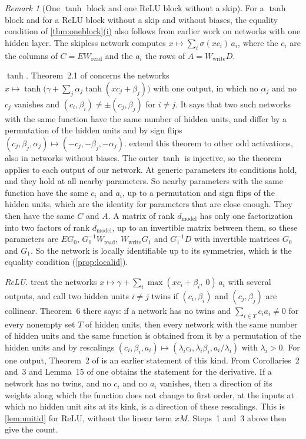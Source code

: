 \documentclass[10pt]{article}
\theoremstyle{definition}
\theoremstyle{remark}
\newtheorem{remark}[theorem]{Remark}
\newcommand{\Wread}{W_{\mathrm{read}}}
\newcommand{\Wwrite}{W_{\mathrm{write}}}
\newcommand{\dm}{d_{\mathrm{model}}}
\DeclareRobustCommand{\cpref}[2]{\hyperref[#1:#2]{\cref*{#1}(#2)}}
\begin{document}
\begin{remark}[One $\tanh$ block and one ReLU block without a skip]\label{rem:onemlp}
For a $\tanh$ block and for a ReLU block without a skip and without biases, the equality condition of \cpref{thm:oneblock}{i} also follows from earlier work on networks with one hidden layer. The skipless network computes $x \mapsto \sum_i \sigma(xc_i)\,a_i$, where the $c_i$ are the columns of $C = E\Wread$ and the $a_i$ the rows of $A = \Wwrite D$.

\emph{$\tanh$.} Theorem~2.1 of \citet{sussmann1992} concerns the networks $x \mapsto \tanh\big(\gamma + \sum_j \alpha_j\tanh(xc_j + \beta_j)\big)$ with one output, in which no $\alpha_j$ and no $c_j$ vanishes and $(c_i, \beta_i) \neq \pm(c_j, \beta_j)$ for $i \neq j$. It says that two such networks with the same function have the same number of hidden units, and differ by a permutation of the hidden units and by sign flips $(c_j, \beta_j, \alpha_j) \mapsto (-c_j, -\beta_j, -\alpha_j)$. \citet{albertini1993uniqueness} extend this theorem to other odd activations, also in networks without biases. The outer $\tanh$ is injective, so the theorem applies to each output of our network. At generic parameters its conditions hold, and they hold at all nearby parameters. So nearby parameters with the same function have the same $c_i$ and $a_i$, up to a permutation and sign flips of the hidden units, which are the identity for parameters that are close enough. They then have the same $C$ and $A$. A matrix of rank $\dm$ has only one factorization into two factors of rank $\dm$, up to an invertible matrix between them, so these parameters are $EG_0$, $G_0^{-1}\Wread$, $\Wwrite G_1$ and $G_1^{-1}D$ with invertible matrices $G_0$ and $G_1$. So the network is locally identifiable up to its symmetries, which is the equality condition (\cref{prop:localid}).

\emph{ReLU.} \citet{stock2021embedding} treat the networks $x \mapsto \gamma + \sum_i \max(xc_i + \beta_i,\ 0)\,a_i$ with several outputs, and call two hidden units $i \neq j$ twins if $(c_i, \beta_i)$ and $(c_j, \beta_j)$ are collinear. Theorem~6 there says: if a network has no twins and $\sum_{i\in T} c_ia_i \neq 0$ for every nonempty set $T$ of hidden units, then every network with the same number of hidden units and the same function is obtained from it by a permutation of the hidden units and by rescalings $(c_i, \beta_i, a_i) \mapsto (\lambda_ic_i, \lambda_i\beta_i, a_i/\lambda_i)$ with $\lambda_i > 0$. For one output, Theorem~2 of \citet{petzka2020symmetries} is an earlier statement of this kind. From Corollaries~2 and~3 and Lemma~15 of \citet{stock2021embedding} one obtains the statement for the derivative. If a network has no twins, and no $c_i$ and no $a_i$ vanishes, then a direction of its weights along which the function does not change to first order, at the inputs at which no hidden unit sits at its kink, is a direction of these rescalings. This is \cref{lem:unitid} for ReLU, without the linear term $xM$. Steps~1 and~3 above then give the count.
\end{remark}
\end{document}
